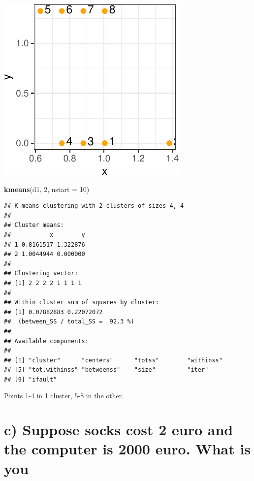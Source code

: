 \documentclass[]{article}
\newenvironment{Shaded}{\begin{snugshade}}{\end{snugshade}}
\newcommand{\DataTypeTok}[1]{\textcolor[rgb]{0.13,0.29,0.53}{#1}}
\newcommand{\DecValTok}[1]{\textcolor[rgb]{0.00,0.00,0.81}{#1}}
\newcommand{\KeywordTok}[1]{\textcolor[rgb]{0.13,0.29,0.53}{\textbf{#1}}}
\newcommand{\NormalTok}[1]{#1}
\begin{document}
\begin{center}\includegraphics{sol_A1_files/figure-latex/unnamed-chunk-4-1} \end{center}

\begin{Shaded}
\begin{Highlighting}[]
\KeywordTok{kmeans}\NormalTok{(d1, }\DecValTok{2}\NormalTok{, }\DataTypeTok{nstart =} \DecValTok{10}\NormalTok{)}
\end{Highlighting}
\end{Shaded}

\begin{verbatim}
## K-means clustering with 2 clusters of sizes 4, 4
## 
## Cluster means:
##           x        y
## 1 0.8161517 1.322876
## 2 1.0044944 0.000000
## 
## Clustering vector:
## [1] 2 2 2 2 1 1 1 1
## 
## Within cluster sum of squares by cluster:
## [1] 0.07882883 0.22072072
##  (between_SS / total_SS =  92.3 %)
## 
## Available components:
## 
## [1] "cluster"      "centers"      "totss"        "withinss"    
## [5] "tot.withinss" "betweenss"    "size"         "iter"        
## [9] "ifault"
\end{verbatim}

Points 1-4 in 1 cluster, 5-8 in the other.

\hypertarget{c-suppose-socks-cost-2-euro-and-the-computer-is-2000-euro.-what-is-you}{%
\section{c) Suppose socks cost 2 euro and the computer is 2000 euro.
What is
you}\label{c-suppose-socks-cost-2-euro-and-the-computer-is-2000-euro.-what-is-you}}
\end{document}

